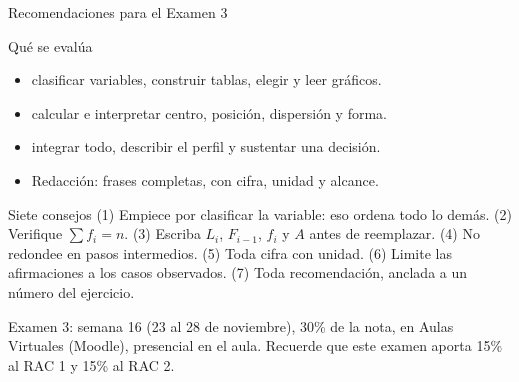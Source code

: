 \documentclass[aspectratio=169,10pt]{beamer}
\begin{document}
\begin{frame}{Recomendaciones para el Examen 3}
  \begin{block}{Qué se evalúa}
    \tiny
    \begin{itemize}\setlength{\itemsep}{-0.02cm}
      \item {} clasificar variables, construir tablas, elegir y
            leer gráficos.
      \item {} calcular e interpretar centro, posición,
            dispersión y forma.
      \item {} integrar todo, describir el perfil y sustentar
            una decisión.
      \item Redacción: frases completas, con cifra, unidad y alcance.
    \end{itemize}
  \end{block}

  \vspace{0.08cm}
  \begin{alertblock}{Siete consejos}
    \tiny
    (1) Empiece por clasificar la variable: eso ordena todo lo demás. \quad
    (2) Verifique $\sum f_i = n$. \quad (3) Escriba $L_i$, $F_{i-1}$, $f_i$ y
    $A$ antes de reemplazar. \quad (4) No redondee en pasos intermedios. \quad
    (5) Toda cifra con unidad. \quad (6) Limite las afirmaciones a los casos
    observados. \quad (7) Toda recomendación, anclada a un número del
    ejercicio.
  \end{alertblock}

  \vspace{0.08cm}
  {\tiny\color{uniGris} Examen 3: semana 16 (23 al 28 de noviembre), 30\% de
  la nota, en Aulas Virtuales (Moodle), presencial en el aula. Recuerde que
  este examen aporta 15\% al RAC 1 y 15\% al RAC 2.}
\end{frame}
\end{document}
